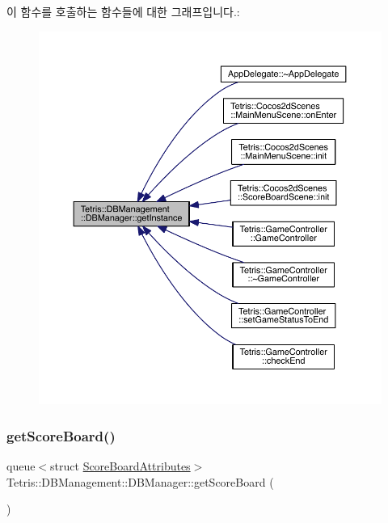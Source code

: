 이 함수를 호출하는 함수들에 대한 그래프입니다.\+:
\nopagebreak
\begin{figure}[H]
\begin{center}
\leavevmode
\includegraphics[width=350pt]{class_tetris_1_1_d_b_management_1_1_d_b_manager_a9cb81505055490211a9b5c79c3c22c18_icgraph}
\end{center}
\end{figure}
\mbox{\label{class_tetris_1_1_d_b_management_1_1_d_b_manager_aa67ef286408b2631e15e9f8f41937c97}} 
\subsubsection{\texorpdfstring{get\+Score\+Board()}{getScoreBoard()}}
{\footnotesize\ttfamily queue$<$struct \hyperlink{struct_tetris_1_1_d_b_management_1_1_score_board_attributes}{Score\+Board\+Attributes}$>$ Tetris\+::\+D\+B\+Management\+::\+D\+B\+Manager\+::get\+Score\+Board (\begin{DoxyParamCaption}{ }\end{DoxyParamCaption})\hspace{0.3cm}{\ttfamily [inline]}}

